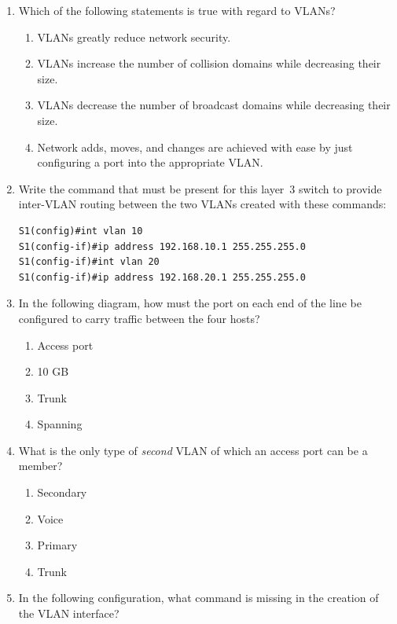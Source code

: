 \documentclass[b5paper,11pt]{memoir}
\begin{document}
\begin{enumerate}
\item
  Which of the following statements is true with regard to VLANs?

  \begin{enumerate}
  \tightlist
  \item
    VLANs greatly reduce network security.
  \item
    VLANs increase the number of collision domains while decreasing
    their size.
  \item
    VLANs decrease the number of broadcast domains while decreasing
    their size.
  \item
    Network adds, moves, and changes are achieved with ease by just
    configuring a port into the appropriate VLAN.
  \end{enumerate}
\item
  Write the command that must be present for this layer~3 switch to
  provide inter-VLAN routing between the two VLANs created with these
  commands:

\begin{verbatim}
S1(config)#int vlan 10
S1(config-if)#ip address 192.168.10.1 255.255.255.0
S1(config-if)#int vlan 20
S1(config-if)#ip address 192.168.20.1 255.255.255.0
\end{verbatim}
\item
  In the following diagram, how must the port on each end of the line be
  configured to carry traffic between the four hosts?

  \begin{figure}
  \centering
  \caption{}
  \end{figure}

  \begin{enumerate}
  \tightlist
  \item
     Access port
  \item
    10 GB
  \item
    Trunk
  \item
    Spanning
  \end{enumerate}
\item
  What is the only type of \emph{second} VLAN of which an access port
  can be a member?

  \begin{enumerate}
  \tightlist
  \item
    Secondary
  \item
    Voice
  \item
    Primary
  \item
    Trunk
  \end{enumerate}
\item
  In the following configuration, what command is missing in the
  creation of the VLAN interface?


\end{enumerate}
\end{document}
